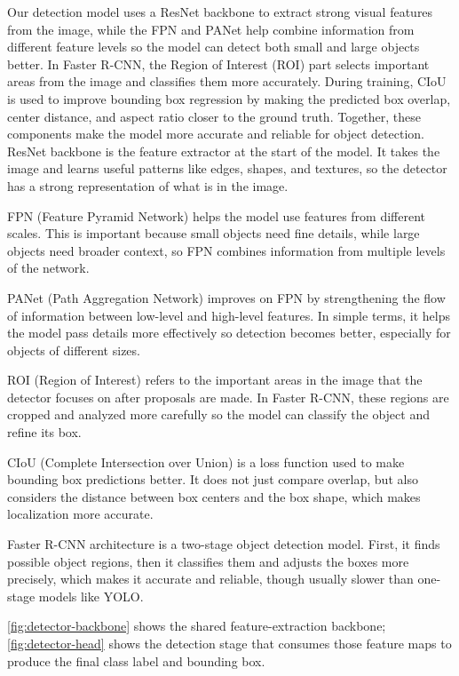 Our detection model uses a ResNet backbone to extract strong visual features from the image, while the FPN and PANet help combine information from different feature levels so the model can detect both small and large objects better. In Faster R-CNN, the Region of Interest (ROI) part selects important areas from the image and classifies them more accurately. During training, CIoU is used to improve bounding box regression by making the predicted box overlap, center distance, and aspect ratio closer to the ground truth. Together, these components make the model more accurate and reliable for object detection.
ResNet backbone is the feature extractor at the start of the model. It takes the image and learns useful patterns like edges, shapes, and textures, so the detector has a strong representation of what is in the image.

FPN (Feature Pyramid Network) helps the model use features from different scales. This is important because small objects need fine details, while large objects need broader context, so FPN combines information from multiple levels of the network.

PANet (Path Aggregation Network) improves on FPN by strengthening the flow of information between low-level and high-level features. In simple terms, it helps the model pass details more effectively so detection becomes better, especially for objects of different sizes.

ROI (Region of Interest) refers to the important areas in the image that the detector focuses on after proposals are made. In Faster R-CNN, these regions are cropped and analyzed more carefully so the model can classify the object and refine its box.

CIoU (Complete Intersection over Union) is a loss function used to make bounding box predictions better. It does not just compare overlap, but also considers the distance between box centers and the box shape, which makes localization more accurate.

Faster R-CNN architecture is a two-stage object detection model. First, it finds possible object regions, then it classifies them and adjusts the boxes more precisely, which makes it accurate and reliable, though usually slower than one-stage models like YOLO.

\autoref{fig:detector-backbone} shows the shared feature-extraction backbone;
\autoref{fig:detector-head} shows the detection stage that consumes those
feature maps to produce the final class label and bounding box.

